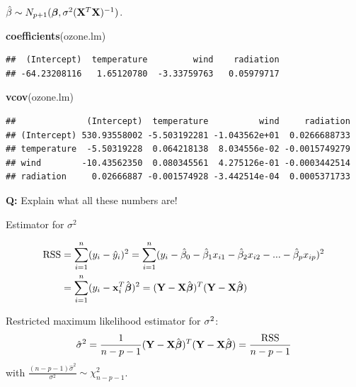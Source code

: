 \documentclass[10pt,ignorenonframetext,]{beamer}
\newenvironment{Shaded}{\begin{snugshade}}{\end{snugshade}}
\newcommand{\KeywordTok}[1]{\textcolor[rgb]{0.13,0.29,0.53}{\textbf{#1}}}
\newcommand{\NormalTok}[1]{#1}
\begin{document}
\begin{frame}[fragile]

\(\hat{\beta}\sim N_{p+1}(\boldsymbol{\beta},\sigma^2({\bf X}^T{\bf X})^{-1})\).

\footnotesize

\begin{Shaded}
\begin{Highlighting}[]
\KeywordTok{coefficients}\NormalTok{(ozone.lm)}
\end{Highlighting}
\end{Shaded}

\begin{verbatim}
##  (Intercept)  temperature         wind    radiation 
## -64.23208116   1.65120780  -3.33759763   0.05979717
\end{verbatim}

\begin{Shaded}
\begin{Highlighting}[]
\KeywordTok{vcov}\NormalTok{(ozone.lm)}
\end{Highlighting}
\end{Shaded}

\begin{verbatim}
##              (Intercept)  temperature          wind     radiation
## (Intercept) 530.93558002 -5.503192281 -1.043562e+01  0.0266688733
## temperature  -5.50319228  0.064218138  8.034556e-02 -0.0015749279
## wind        -10.43562350  0.080345561  4.275126e-01 -0.0003442514
## radiation     0.02666887 -0.001574928 -3.442514e-04  0.0005371733
\end{verbatim}

\normalsize

\textbf{Q:} Explain what all these numbers are!

\end{frame}

\begin{frame}

\begin{block}{Estimator for \(\sigma^2\)}

\[\begin{aligned} \text{RSS} &=\sum_{i=1}^n (y_i - \hat y_i)^2 = \sum_{i=1}^n (y_i - \hat \beta_0 - \hat \beta_1 x_{i1} - \hat \beta_2 x_{i2} -...-\hat \beta_p x_{ip} )^2 \\
&= \sum_{i=1}^n (y_i-{\bf x}_i^T \hat{\boldsymbol \beta})^2=({\bf Y}-{\bf X}\hat{\boldsymbol{\beta}})^T({\bf Y}-{\bf X}\hat{\boldsymbol{\beta}})\end{aligned}\]

Restricted maximum likelihood estimator for \({\bf \sigma}^2\):
\[ \hat{\sigma}^2=\frac{1}{n-p-1}({\bf Y}-{\bf X}\hat{\boldsymbol\beta})^T({\bf Y}-{\bf X}\hat{\boldsymbol\beta})=\frac{\text{RSS}}{n-p-1}\]
with \(\frac{(n-p-1)\hat{\sigma}^2}{\sigma^2} \sim \chi^2_{n-p-1}\).

\end{block}

\end{frame}
\end{document}
